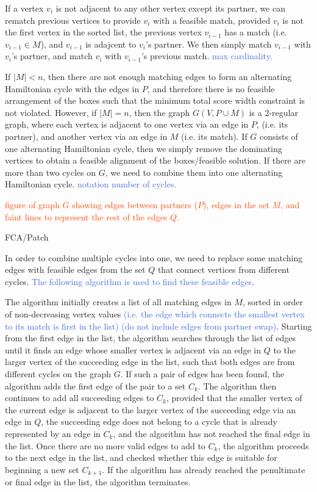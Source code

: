 \documentclass[oribibl]{llncs}
\begin{document}
If a vertex $v_i$ is not adjacent to any other vertex except its partner, we can rematch previous vertices to provide $v_i$ with a feasible match, provided $v_i$ is not the first vertex in the sorted list, the previous vertex $v_{i-1}$ has a match (i.e. $v_{i-1} \in M$), and $v_{i-1}$ is adajcent to $v_i$'s partner. We then simply match $v_{i-1}$ with $v_i$'s partner, and match $v_i$ with $v_{i-1}$'s previous match. \textcolor{RoyalBlue}{max cardinality.}

If $|M| < n$, then there are not enough matching edges to form an alternating Hamiltonian cycle with the edges in $P$, and therefore there is no feasible arrangement of the boxes such that the minimum total score width constraint is not violated. However, if $|M| = n$, then the graph $G(V, P \cup M)$ is a 2-regular graph, where each vertex is adjacent to one vertex via an edge in $P$, (i.e. its partner), and another vertex via an edge in $M$ (i.e. its match). If $G$ consists of one alternating Hamiltonian cycle, then we simply remove the dominating vertices to obtain a feasible alignment of the boxes/feasible solution. If there are more than two cycles on $G$, we need to combine them into one alternating Hamiltonian cycle. \textcolor{RoyalBlue}{notation number of cycles.}

\textcolor{OrangeRed}{figure of graph $G$ showing edges between partners ($P$), edges in the set $M$, and faint lines to represent the rest of the edges $Q$.}


FCA/Patch

In order to combine multiple cycles into one, we need to replace some matching edges with feasible edges from the set $Q$ that connect vertices from different cycles. \textcolor{RoyalBlue}{The following algorithm is used to find these feasible edges}.

The algorithm initially creates a list of all matching edges in $M$, sorted in order of non-decreasing vertex values \textcolor{RoyalBlue}{(i.e. the edge which connects the smallest vertex to its match is first in the list) (do not include edges from partner swap)}. Starting from the first edge in the list, the algorithm searches through the list of edges until it finds an edge whose smaller vertex is adjacent via an edge in $Q$ to the larger vertex of the succeeding edge in the list, such that both edges are from different cycles on the graph $G$. If such a pair of edges has been found, the algorithm adds the first edge of the pair to a set $C_k$. The algorithm then continues to add all succeeding edges to $C_k$, provided that the smaller vertex of the current edge is adjacent to the larger vertex of the succeeding edge via an edge in $Q$, the succeeding edge does not belong to a cycle that is already represented by an edge in $C_k$, and the algorithm has not reached the final edge in the list. Once there are no more valid edges to add to $C_k$, the algorithm proceeds to the next edge in the list, and checked whether this edge is suitable for beginning a new set $C_{k+1}$. If the algorithm has already reached the penultimate or final edge in the list, the algorithm terminates.
\end{document}
